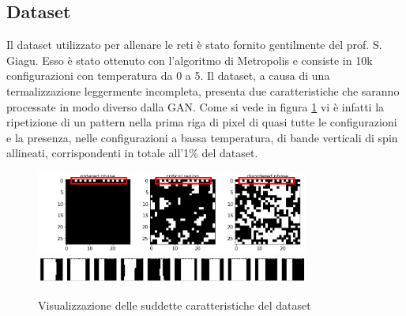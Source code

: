 \documentclass[a4paper]{article}
\begin{document}
\subsection{Dataset}
Il dataset utilizzato per allenare le reti è stato fornito gentilmente del prof. S. Giagu. Esso è stato ottenuto con l'algoritmo di Metropolis e consiste in 10k configurazioni con temperatura da 0 a 5. Il dataset, a causa di una termalizzazione leggermente incompleta, presenta due caratteristiche che saranno processate in modo diverso dalla GAN. Come si vede in figura \ref{difetti} vi è infatti la ripetizione di un pattern nella prima riga di pixel di quasi tutte le configurazioni e la presenza, nelle configurazioni a bassa temperatura, di bande verticali di spin allineati, corrispondenti in totale all'1\% del dataset.
\begin{figure}[H]
\includegraphics[width=0.8\textwidth]{dataset.png}\\
\includegraphics[width=0.8\textwidth]{difetti.png}
\centering
\caption{Visualizzazione delle suddette caratteristiche del dataset}
\label{difetti}
\end{figure}
\end{document}
